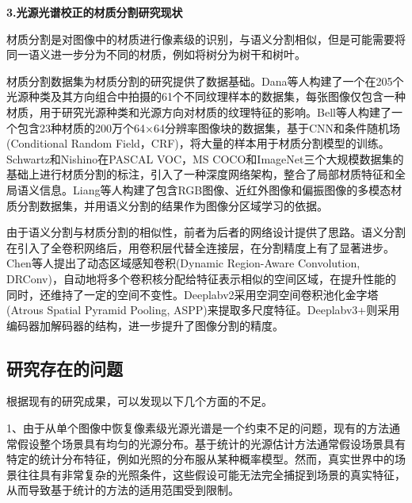 \documentclass[
    type = master, %
    degree = academic,        %
    decl-page,  %
  ]{njuthesis}
\begin{document}

\textbf{3.光源光谱校正的材质分割研究现状}

材质分割是对图像中的材质进行像素级的识别\cite{liang2022multimodal}，与语义分割相似，但是可能需要将同一语义进一步分为不同的材质，例如将树分为树干和树叶。

材质分割数据集为材质分割的研究提供了数据基础。Dana等人\cite{MS5}构建了一个在205个光源种类及其方向组合中拍摄的61个不同纹理样本的数据集，每张图像仅包含一种材质，用于研究光源种类和光源方向对材质的纹理特征的影响。Bell等人\cite{MS1}构建了一个包含23种材质的200万个64×64分辨率图像块的数据集，基于CNN和条件随机场(Conditional Random Field，CRF)，将大量的样本用于材质分割模型的训练。Schwartz和Nishino\cite{MS21}在PASCAL VOC\cite{VOC}，MS COCO\cite{COCO}和ImageNet\cite{IMAGENET}三个大规模数据集的基础上进行材质分割的标注，引入了一种深度网络架构，整合了局部材质特征和全局语义信息。Liang等人\cite{liang2022multimodal}构建了包含RGB图像、近红外图像和偏振图像的多模态材质分割数据集，并用语义分割的结果作为图像分区域学习的依据。

由于语义分割与材质分割的相似性，前者为后者的网络设计提供了思路。语义分割在引入了全卷积网络后，用卷积层代替全连接层，在分割精度上有了显著进步\cite{MS14}。Chen等人\cite{MS2}提出了动态区域感知卷积(Dynamic Region-Aware Convolution, DRConv)，自动地将多个卷积核分配给特征表示相似的空间区域，在提升性能的同时，还维持了一定的空间不变性。Deeplabv2\cite{MS3}采用空洞空间卷积池化金字塔(Atrous Spatial Pyramid Pooling, ASPP)来提取多尺度特征。Deeplabv3+\cite{deeplabv3+}则采用编码器加解码器的结构，进一步提升了图像分割的精度。

\subsection{研究存在的问题}
根据现有的研究成果，可以发现以下几个方面的不足。

1、由于从单个图像中恢复像素级光源光谱是一个约束不足的问题，现有的方法通常假设整个场景具有均匀的光源分布。基于统计的光源估计方法通常假设场景具有特定的统计分布特征，例如光照的分布服从某种概率模型。然而，真实世界中的场景往往具有非常复杂的光照条件，这些假设可能无法完全捕捉到场景的真实特征，从而导致基于统计的方法的适用范围受到限制。
\end{document}
